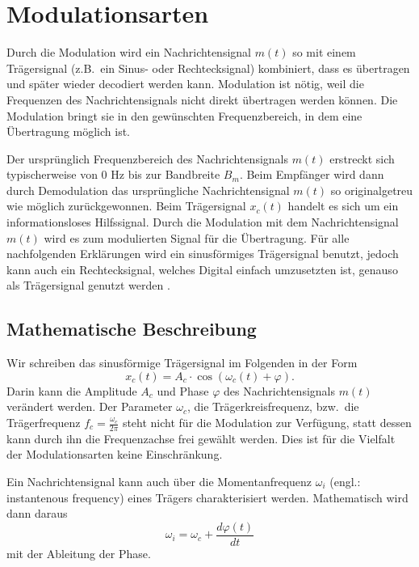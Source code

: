 %
%
%

%
%
\section{Modulationsarten
\label{fm:section:modulation}}
Durch die Modulation wird ein Nachrichtensignal \(m(t)\) so mit einem
Trägersignal (z.B.~ein Sinus- oder Rechtecksignal) kombiniert,
dass es übertragen und später wieder decodiert werden kann.
Modulation ist nötig, weil die Frequenzen des Nachrichtensignals
nicht direkt übertragen werden können.
Die Modulation bringt sie in den gewünschten Frequenzbereich, in dem
eine Übertragung möglich ist.

Der ursprünglich Frequenzbereich des Nachrichtensignals \(m(t)\)
erstreckt sich typischerweise von 0 Hz bis zur Bandbreite \(B_m\).
Beim Empfänger wird dann durch Demodulation das ursprüngliche
Nachrichtensignal \(m(t)\) so originalgetreu wie möglich zurückgewonnen.
Beim Trägersignal \(x_c(t)\) handelt es sich um ein informationsloses
Hilfssignal.
Durch die Modulation mit dem Nachrichtensignal \(m(t)\) wird es zum
modulierten Signal für die Übertragung.
Für alle nachfolgenden Erklärungen wird ein sinusförmiges Trägersignal
benutzt, jedoch kann auch ein Rechtecksignal, welches Digital einfach
umzusetzten ist, genauso als Trägersignal genutzt werden \cite{fm:NAT}.

\subsection{Mathematische Beschreibung}
Wir schreiben
das sinusförmige Trägersignal im Folgenden in der Form
\[
x_c(t) = A_c \cdot \cos(\omega_c(t)+\varphi).
\]
Darin kann die Amplitude \(A_c\) und Phase \(\varphi\) des
Nachrichtensignals \(m(t)\) verändert werden.
Der Parameter \(\omega_c\), die Trägerkreisfrequenz, bzw.~die
Trägerfrequenz \(f_c = \frac{\omega_c}{2\pi}\)
steht nicht für die Modulation zur Verfügung, statt dessen kann durch
ihn die Frequenzachse frei gewählt werden.
Dies ist für die Vielfalt der Modulationsarten keine Einschränkung.

Ein Nachrichtensignal kann auch über die Momentanfrequenz
\(\omega_i\)
(engl.: instantenous frequency)
eines Trägers charakterisiert werden.
Mathematisch wird dann daraus
\[
    \omega_i = \omega_c + \frac{d \varphi(t)}{dt}
\]
mit der Ableitung der Phase\cite{fm:NAT}.

